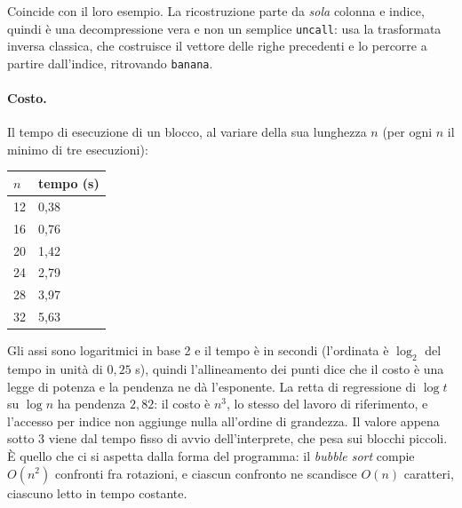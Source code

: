 \noindent
Coincide con il loro esempio. La ricostruzione parte da \emph{sola} colonna e
indice, quindi è una decompressione vera e non un semplice \texttt{uncall}: usa
la trasformata inversa classica, che costruisce il vettore delle righe
precedenti e lo percorre a partire dall'indice, ritrovando \texttt{banana}.

\paragraph{Costo.} Il tempo di esecuzione di un blocco, al variare della sua
lunghezza $n$ (per ogni $n$ il minimo di tre esecuzioni):

\begin{center}
\begin{minipage}[c]{0.28\textwidth}
\centering
\begin{tabular}{ll}
\hline
$n$ & tempo (s)\\
\hline
12 & 0{,}38\\
16 & 0{,}76\\
20 & 1{,}42\\
24 & 2{,}79\\
28 & 3{,}97\\
32 & 5{,}63\\
\hline
\end{tabular}
\end{minipage}%
\hfill
\begin{minipage}[c]{0.66\textwidth}
\centering
\end{minipage}
\end{center}

\noindent
Gli assi sono logaritmici in base 2 e il tempo è in secondi (l'ordinata è
$\log_2$ del tempo in unità di $0{,}25$ s), quindi l'allineamento dei punti dice
che il costo è una legge di potenza e la pendenza ne dà l'esponente. La retta di
regressione di $\log t$ su $\log n$ ha pendenza $2{,}82$: il costo è $n^3$, lo
stesso del lavoro di riferimento, e l'accesso per indice non aggiunge nulla
all'ordine di grandezza. Il valore appena sotto $3$ viene dal tempo fisso di
avvio dell'interprete, che pesa sui blocchi piccoli. È quello che ci si aspetta
dalla forma del programma: il \emph{bubble sort} compie $O(n^2)$ confronti fra
rotazioni, e ciascun confronto ne scandisce $O(n)$ caratteri, ciascuno letto in
tempo costante.

